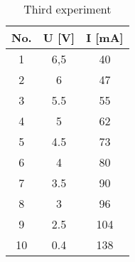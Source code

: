 \begin{table}[hptb]
	\centering
	\caption{Third experiment}
	\label{tab:tab1}
	\begin{tabular}{|c|c|c|}
		\hline
		No. & U [\unit{\volt}] & I [\unit{\milli\ampere}]  \\
		\hline
		1& 6,5 & 40 \\
		\hline
		2& 6 & 47 \\
		\hline
		3& 5.5 & 55 \\
		\hline
		4& 5 & 62 \\
		\hline
        5& 4.5 & 73 \\
		\hline
        6& 4 & 80 \\
		\hline
        7& 3.5 & 90 \\
		\hline
        8& 3 & 96 \\
		\hline
        9& 2.5 & 104 \\
		\hline
        10& 0.4 & 138 \\
		\hline
	\end{tabular}
\end{table}